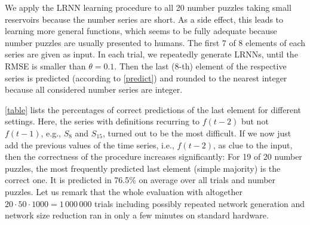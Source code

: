 \documentclass[twoside,11pt]{article}
\theoremstyle{definition}
\begin{document}
We apply the LRNN learning procedure to all 20 number puzzles taking small
reservoirs because the number series are short. As a side effect, this leads to
learning more general functions, which seems to be fully adequate because number
puzzles are usually presented to humans. The first 7 of 8 elements of each
series are given as input. In each trial, we repeatedly generate LRNNs, until the
RMSE is smaller than $\theta=0.1$. Then the last (8-th) element of the
respective series is predicted (according to \cref{predict}) and rounded to the
nearest integer because all considered number series are integer.

\cref{table} lists the percentages of correct predictions of the last
element for different settings. Here, the series with definitions recurring to
$f(t-2)$ but not $f(t-1)$, e.g., $S_8$ and $S_{15}$, turned out to be the most
difficult. If we now just add the previous values of the time series, i.e., $f(t-2)$,
as clue to the input, then the correctness of the procedure increases
significantly: For 19 of 20 number puzzles, the most frequently predicted last
element (simple majority) is the correct one. It is predicted in 76.5\% on
average over all trials and number puzzles. Let us remark that the whole
evaluation with altogether $20 \cdot 50 \cdot 1000 = 1\,000\,000$ trials
including possibly repeated network generation and network size reduction ran in
only a few minutes on standard hardware.
\end{document}
